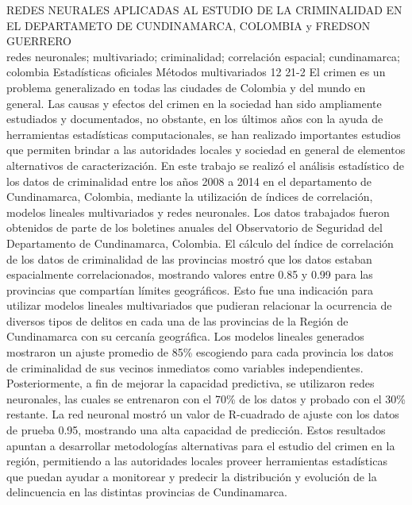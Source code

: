 \A
{REDES NEURALES APLICADAS AL ESTUDIO DE LA CRIMINALIDAD EN EL DEPARTAMETO DE CUNDINAMARCA, COLOMBIA}
{ y FREDSON GUERRERO}
{
\\}
{redes neuronales; multivariado; criminalidad; correlación espacial; cundinamarca; colombia} 
 {Estadísticas oficiales} 
 {Métodos multivariados} 
 {12} 
 {21-2}
{El crimen es un problema generalizado en todas las ciudades de Colombia y del mundo en general. Las causas y efectos del crimen en la sociedad han sido ampliamente estudiados y documentados, no obstante, en los últimos años con la ayuda de herramientas estadísticas computacionales, se han realizado importantes estudios que permiten brindar a las autoridades locales y sociedad en general de elementos alternativos de caracterización. En este trabajo se realizó el análisis estadístico de los datos de criminalidad entre los años 2008 a 2014 en el departamento de Cundinamarca, Colombia, mediante la utilización de índices de correlación, modelos lineales multivariados y redes neuronales. Los datos trabajados fueron obtenidos de parte de los boletines anuales del Observatorio de Seguridad del Departamento de Cundinamarca, Colombia. El cálculo del índice de correlación de los datos de criminalidad de las provincias mostró que los datos estaban espacialmente correlacionados, mostrando valores entre 0.85 y 0.99 para las provincias que compartían límites geográficos. Esto fue una indicación para utilizar modelos lineales multivariados que pudieran relacionar la ocurrencia de diversos tipos de delitos en cada una de las provincias de la Región de Cundinamarca con su cercanía geográfica. Los modelos lineales generados mostraron un ajuste promedio de 85\% escogiendo para cada provincia los datos de criminalidad de sus vecinos inmediatos como variables independientes. Posteriormente, a fin de mejorar la capacidad predictiva, se utilizaron redes neuronales, las cuales se entrenaron con el 70\% de los datos y probado con el 30\% restante. La red neuronal mostró un valor de R-cuadrado de ajuste con los datos de prueba 0.95, mostrando una alta capacidad de predicción. Estos resultados apuntan a desarrollar metodologías alternativas para el estudio del crimen en la región, permitiendo a las autoridades locales proveer herramientas estadísticas que puedan ayudar a monitorear y predecir la distribución y evolución de la delincuencia en las distintas provincias de Cundinamarca.}
